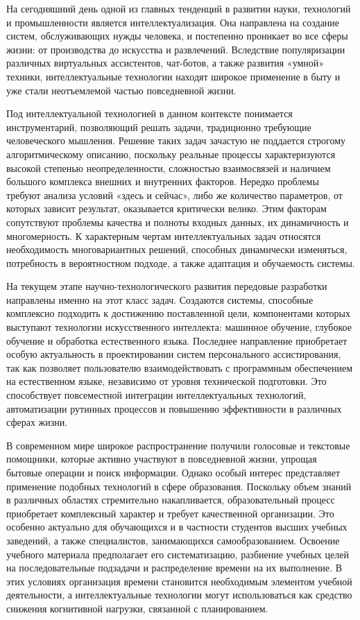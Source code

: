 
На сегодняшний день одной из главных тенденций в развитии науки, технологий и промышленности является интеллектуализация. Она направлена на создание систем, обслуживающих нужды человека, и постепенно проникает во все сферы жизни: от производства до искусства и развлечений. Вследствие популяризации различных виртуальных ассистентов, чат-ботов, а также развития «умной» техники, интеллектуальные технологии находят широкое применение в быту и уже стали неотъемлемой частью повседневной жизни.

Под интеллектуальной технологией в данном контексте понимается инструментарий, позволяющий решать задачи, традиционно требующие человеческого мышления. Решение таких задач зачастую не поддается строгому алгоритмическому описанию, поскольку реальные процессы характеризуются высокой степенью неопределенности, сложностью взаимосвязей и наличием большого комплекса внешних и внутренних факторов. Нередко проблемы требуют анализа условий «здесь и сейчас», либо же количество параметров, от которых зависит результат, оказывается критически велико. Этим факторам сопутствуют проблемы качества и полноты входных данных, их динамичность и многомерность. К характерным чертам интеллектуальных задач относятся необходимость многовариантных решений, способных динамически изменяться, потребность в вероятностном подходе, а также адаптация и обучаемость системы.

На текущем этапе научно-технологического развития передовые разработки направлены именно на этот класс задач. Создаются системы, способные комплексно подходить к достижению поставленной цели, компонентами которых выступают технологии искусственного интеллекта: машинное обучение, глубокое обучение и обработка естественного языка. Последнее направление приобретает особую актуальность в проектировании систем персонального ассистирования, так как позволяет пользователю взаимодействовать с программным обеспечением на естественном языке, независимо от уровня технической подготовки. Это способствует повсеместной интеграции интеллектуальных технологий, автоматизации рутинных процессов и повышению эффективности в различных сферах жизни.

В современном мире широкое распространение получили голосовые и текстовые помощники, которые активно участвуют в повседневной жизни, упрощая бытовые операции и поиск информации. Однако особый интерес представляет применение подобных технологий в сфере образования. Поскольку объем знаний в различных областях стремительно накапливается, образовательный процесс приобретает комплексный характер и требует качественной организации. Это особенно актуально для обучающихся и в частности студентов высших учебных заведений, а также специалистов, занимающихся самообразованием. Освоение учебного материала предполагает его систематизацию, разбиение учебных целей на последовательные подзадачи и распределение времени на их выполнение. В этих условиях организация времени становится необходимым элементом учебной деятельности, а интеллектуальные технологии могут использоваться как средство снижения когнитивной нагрузки, связанной с планированием.

